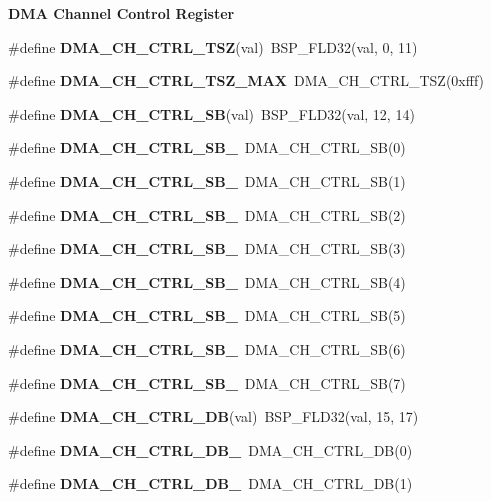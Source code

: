 \begin{Indent}\textbf{ D\+MA Channel Control Register}\par
\begin{DoxyCompactItemize}
\item 
\#define {\bfseries D\+M\+A\+\_\+\+C\+H\+\_\+\+C\+T\+R\+L\+\_\+\+T\+SZ}(val)~B\+S\+P\+\_\+\+F\+L\+D32(val, 0, 11)
\item 
\#define {\bfseries D\+M\+A\+\_\+\+C\+H\+\_\+\+C\+T\+R\+L\+\_\+\+T\+S\+Z\+\_\+\+M\+AX}~D\+M\+A\+\_\+\+C\+H\+\_\+\+C\+T\+R\+L\+\_\+\+T\+SZ(0xfff)
\item 
\#define {\bfseries D\+M\+A\+\_\+\+C\+H\+\_\+\+C\+T\+R\+L\+\_\+\+SB}(val)~B\+S\+P\+\_\+\+F\+L\+D32(val, 12, 14)
\item 
\#define {\bfseries D\+M\+A\+\_\+\+C\+H\+\_\+\+C\+T\+R\+L\+\_\+\+S\+B\+\_}~D\+M\+A\+\_\+\+C\+H\+\_\+\+C\+T\+R\+L\+\_\+\+SB(0)
\item 
\#define {\bfseries D\+M\+A\+\_\+\+C\+H\+\_\+\+C\+T\+R\+L\+\_\+\+S\+B\+\_}~D\+M\+A\+\_\+\+C\+H\+\_\+\+C\+T\+R\+L\+\_\+\+SB(1)
\item 
\#define {\bfseries D\+M\+A\+\_\+\+C\+H\+\_\+\+C\+T\+R\+L\+\_\+\+S\+B\+\_}~D\+M\+A\+\_\+\+C\+H\+\_\+\+C\+T\+R\+L\+\_\+\+SB(2)
\item 
\#define {\bfseries D\+M\+A\+\_\+\+C\+H\+\_\+\+C\+T\+R\+L\+\_\+\+S\+B\+\_}~D\+M\+A\+\_\+\+C\+H\+\_\+\+C\+T\+R\+L\+\_\+\+SB(3)
\item 
\#define {\bfseries D\+M\+A\+\_\+\+C\+H\+\_\+\+C\+T\+R\+L\+\_\+\+S\+B\+\_}~D\+M\+A\+\_\+\+C\+H\+\_\+\+C\+T\+R\+L\+\_\+\+SB(4)
\item 
\#define {\bfseries D\+M\+A\+\_\+\+C\+H\+\_\+\+C\+T\+R\+L\+\_\+\+S\+B\+\_}~D\+M\+A\+\_\+\+C\+H\+\_\+\+C\+T\+R\+L\+\_\+\+SB(5)
\item 
\#define {\bfseries D\+M\+A\+\_\+\+C\+H\+\_\+\+C\+T\+R\+L\+\_\+\+S\+B\+\_}~D\+M\+A\+\_\+\+C\+H\+\_\+\+C\+T\+R\+L\+\_\+\+SB(6)
\item 
\#define {\bfseries D\+M\+A\+\_\+\+C\+H\+\_\+\+C\+T\+R\+L\+\_\+\+S\+B\+\_}~D\+M\+A\+\_\+\+C\+H\+\_\+\+C\+T\+R\+L\+\_\+\+SB(7)
\item 
\#define {\bfseries D\+M\+A\+\_\+\+C\+H\+\_\+\+C\+T\+R\+L\+\_\+\+DB}(val)~B\+S\+P\+\_\+\+F\+L\+D32(val, 15, 17)
\item 
\#define {\bfseries D\+M\+A\+\_\+\+C\+H\+\_\+\+C\+T\+R\+L\+\_\+\+D\+B\+\_}~D\+M\+A\+\_\+\+C\+H\+\_\+\+C\+T\+R\+L\+\_\+\+DB(0)
\item 
\#define {\bfseries D\+M\+A\+\_\+\+C\+H\+\_\+\+C\+T\+R\+L\+\_\+\+D\+B\+\_}~D\+M\+A\+\_\+\+C\+H\+\_\+\+C\+T\+R\+L\+\_\+\+DB(1)

\end{DoxyCompactItemize}
\end{Indent}
